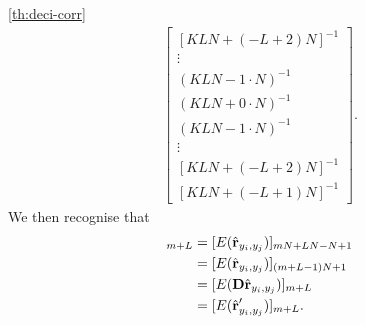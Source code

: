 \documentclass[a4paper, openany, oneside]{memoir}
\begin{document}
\begin{blockProofTheorem}{\ref{th:deci-corr}}
\begin{align*}
\begin{bmatrix}
            [KLN+(-L+2)N]^{-1} \\
            \vdots \\
            (KLN -1 \cdot N)^{-1} \\
            (KLN+ 0 \cdot N)^{-1} \\
            (KLN -1 \cdot N)^{-1} \\
            \vdots \\
            [KLN+(-L+2)N]^{-1} \\
            [KLN+(-L+1)N]^{-1}
         \end{bmatrix}.
    \end{align*}
    We then recognise that
    \begin{align*}
        [E(\vec{w} \odot N\hat{\vec{r}}_{y'_i,y'_j})]_{m+L} &= [E(\hat{\vec{r}}_{y_i,y_j})]_{mN+LN-N+1} \\
        &= [E(\hat{\vec{r}}_{y_i,y_j})]_{(m+L-1)N+1} \\
        &= [E(\mat{D} \hat{\vec{r}}_{y_i,y_j})]_{m+L} \\
        &= [E(\hat{\vec{r}}'_{y_i,y_j})]_{m+L}.
    \end{align*}
\end{blockProofTheorem}
\end{document}
